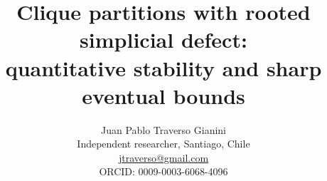 \documentclass[english,11pt,a4paper]{article}
\title{Clique partitions with rooted simplicial defect:\\quantitative stability and sharp eventual bounds}
\author{Juan Pablo Traverso Gianini\\
\small Independent researcher, Santiago, Chile\\
\small \href{mailto:jtraverso@gmail.com}{jtraverso@gmail.com}\\
\small ORCID: 0009-0003-6068-4096}
\date{}
\begin{document}
\raggedbottom
\maketitle
\end{document}
